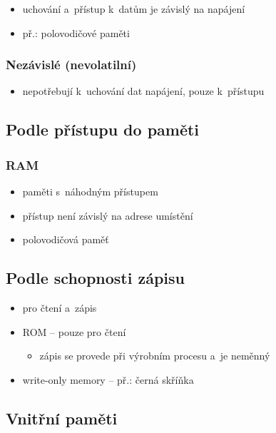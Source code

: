 \documentclass[a4paper,12pt]{article}
\providecommand{\tightlist}{%
\setlength{\itemsep}{0pt}\setlength{\parskip}{0pt}}
\begin{document}
\begin{itemize}
\tightlist
\item uchování a~přístup k~datům je závislý na napájení
\item př.: polovodičové paměti
\end{itemize}

\subsubsection{Nezávislé (nevolatilní)}

\begin{itemize}
\tightlist
\item nepotřebují k~uchování dat napájení, pouze k~přístupu
\end{itemize}

\subsection{Podle přístupu do paměti}

\subsubsection{RAM}

\begin{itemize}
\tightlist
\item paměti s~náhodným přístupem
\item přístup není závislý na adrese umístění
\item polovodičová paměť
\end{itemize}

\subsection{Podle schopnosti zápisu}

\begin{itemize}
\tightlist
\item pro čtení a~zápis
\item ROM -- pouze pro čtení

  \begin{itemize}
  \tightlist
  \item zápis se provede při výrobním procesu a~je neměnný
  \end{itemize}
\item write-only memory -- př.: černá skříňka
\end{itemize}

\subsection{Vnitřní paměti}
\end{document}
